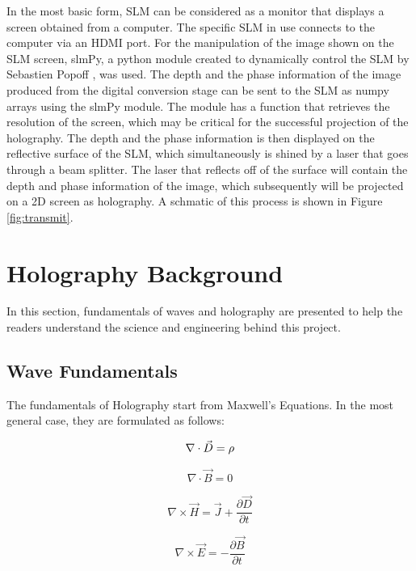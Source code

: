 \documentclass[12pt]{article}
\begin{document}
In the most basic form, SLM can be considered as a monitor that displays a screen obtained from a computer. The specific SLM in use connects to the computer via an HDMI port. For the manipulation of the image shown on the SLM screen, slmPy, a python module created to dynamically control the SLM by Sebastien Popoff \cite{slmPy}, was used. The depth and the phase information of the image produced from the digital conversion stage can be sent to the SLM as numpy arrays using the slmPy module. The module has a function that retrieves the resolution of the screen, which may be critical for the successful projection of the holography. The depth and the phase information is then displayed on the reflective surface of the SLM, which simultaneously is shined by a laser that goes through a beam splitter. The laser that reflects off of the surface will contain the depth and phase information of the image, which subsequently will be projected on a 2D screen as holography. A schmatic of this process is shown in Figure \ref{fig:transmit}.


\section{Holography Background}

In this section, fundamentals of waves and holography are presented to help the readers understand the science and engineering behind this project.

\subsection{Wave Fundamentals}

The fundamentals of Holography start from Maxwell's Equations. In the most general case, they are formulated as follows:

\begin{equation}
	\nabla \cdot \vec{D} = \rho\\
\end{equation}

\begin{equation}
	\nabla \cdot \vec{B} = 0
\end{equation}

\begin{equation}
	\nabla \times \vec{H} = \vec{J} + \frac{\partial \vec{D}}{\partial t}
\end{equation}

\begin{equation}
	\nabla \times \vec{E} = -\frac{\partial \vec{B}}{\partial t}
\end{equation}
\end{document}
